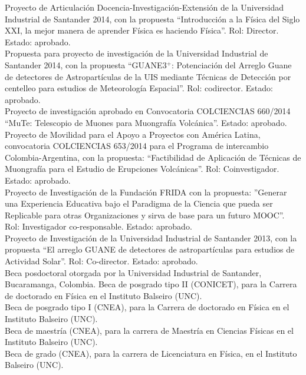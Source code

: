  Proyecto de Articulación Docencia-Investigación-Extensión de la Universidad Industrial de Santander 2014, con la propuesta ``Introducción a la Física del Siglo XXI, la mejor manera de aprender Física es haciendo Física''. Rol: Director. Estado: aprobado.\\
 Propuesta para proyecto de investigación de la Universidad Industrial de Santander 2014, con la propuesta ``GUANE3$^+$: Potenciación del Arreglo Guane de detectores de Astropartículas de la UIS mediante Técnicas de Detección por centelleo para estudios de Meteorología Espacial''. Rol: codirector. Estado: aprobado.\\
 Proyecto de investigación aprobado en Convocatoria COLCIENCIAS 660/2014 ``MuTe: Telescopio de Muones para Muongrafía Volcánica''. Estado: aprobado.\\
 Proyecto de Movilidad para el Apoyo a Proyectos con América Latina, convocatoria COLCIENCIAS 653/2014 para el Programa de intercambio Colombia-Argentina, con la propuesta: ``Factibilidad de Aplicación de Técnicas de Muongrafía para el Estudio de Erupciones Volcánicas''. Rol: Coinvestigador. Estado: aprobado.\\
 Proyecto de Investigación de la Fundación FRIDA con la propuesta: ''Generar una Experiencia Educativa bajo el Paradigma de la Ciencia que pueda ser Replicable para otras Organizaciones y sirva de base para un futuro MOOC''. Rol: Investigador co-responsable. Estado: aprobado.\\
 Proyecto de Investigación de la Universidad Industrial de Santander 2013, con la propuesta ``El arreglo GUANE de detectores de astropartículas para estudios de Actividad Solar''. Rol: Co-director. Estado: aprobado.\\
 Beca posdoctoral otorgada por la Universidad Industrial de Santander, Bucaramanga, Colombia.
 Beca de posgrado tipo II (CONICET), para la Carrera de doctorado en Física en el Instituto Balseiro (UNC).\\
 Beca de posgrado tipo I (CNEA), para la Carrera de doctorado en Física en el Instituto Balseiro (UNC).\\
 Beca de maestría (CNEA), para la carrera de Maestría en Ciencias Físicas en el Instituto Balseiro (UNC).\\
 Beca de grado (CNEA), para la carrera de Licenciatura en Física, en el Instituto Balseiro (UNC).\\
\fi
\fi